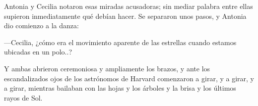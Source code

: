 Antonia y Cecilia notaron esas miradas acusadoras; sin mediar palabra
entre ellas supieron inmediatamente qué debían hacer. Se separaron
unos pasos, y Antonia dio comienzo a la danza:

---Cecilia, ¿cómo era el movimiento aparente de las estrellas cuando
estamos ubicadas en un polo..?

Y ambas abrieron ceremoniosa y ampliamente los brazos, y ante los
escandalizados ojos de los astrónomos de Harvard comenzaron a girar, y
a girar, y a girar, mientras bailaban con las hojas y los árboles y la
brisa y los últimos rayos de Sol.






